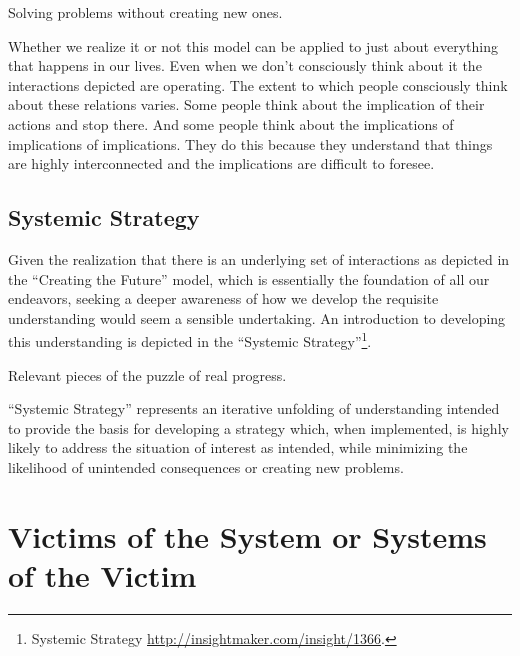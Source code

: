 \documentclass[]{memoir}
\begin{document}
\FloatBarrier 

\begin{model}[frametitle={Model: Creating the Future}] 

 Solving problems without creating new ones.




 \end{model}

Whether we realize it or not this model can be applied to just about
everything that happens in our lives. Even when we don't consciously
think about it the interactions depicted are operating. The extent to
which people consciously think about these relations varies. Some people
think about the implication of their actions and stop there. And some
people think about the implications of implications of implications.
They do this because they understand that things are highly
interconnected and the implications are difficult to foresee.

\subsection{Systemic Strategy}

Given the realization that there is an underlying set of interactions as
depicted in the ``Creating the Future'' model, which is essentially the
foundation of all our endeavors, seeking a deeper awareness of how we
develop the requisite understanding would seem a sensible undertaking.
An introduction to developing this understanding is depicted in the
``Systemic Strategy''\footnote{Systemic Strategy
  \url{http://insightmaker.com/insight/1366}.}.

\FloatBarrier 

\begin{model}[frametitle={Model: Systemic Strategy}] 

 Relevant pieces of the puzzle of real progress.




 \end{model}

``Systemic Strategy'' represents an iterative unfolding of understanding
intended to provide the basis for developing a strategy which, when
implemented, is highly likely to address the situation of interest as
intended, while minimizing the likelihood of unintended consequences or
creating new problems.

\section{Victims of the System or Systems of the Victim}
\end{document}
